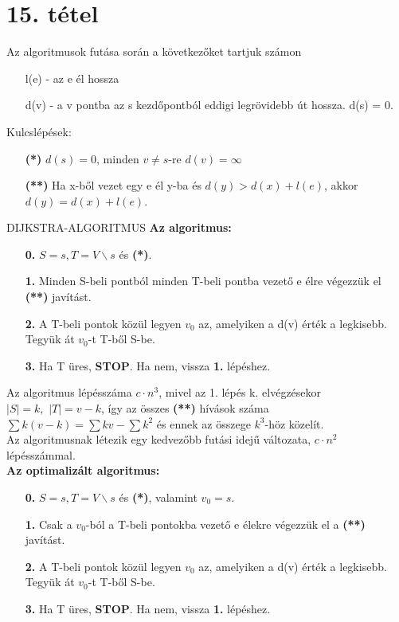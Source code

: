 \section{15. tétel}

\begin{tetel}{Az algoritmusok futása során a következőket tartjuk számon}
\begin{itemize}
\item[] l(e) - az e él hossza
\item[] d(v) - a v pontba az s kezdőpontból eddigi legrövidebb út hossza. d(s) = 0.
\end{itemize}
Kulcslépések:
\begin{itemize}
\item[\textbf{(*)}]$d(s) = 0$, minden $v \neq s$-re $d(v) = \infty$
\item[\textbf{(**)}]Ha x-ből vezet egy e él y-ba és $d(y) > d(x) + l(e)$, akkor $d(y) = d(x) + l(e)$.
\end{itemize}
\end{tetel}

\begin{tetel}{DIJKSTRA-ALGORITMUS}
\textbf{Az algoritmus:}
\begin{itemize}
\item[\textbf{0.}] $S = {s}, T = V\backslash {s}$ és \textbf{(*)}.
\item[\textbf{1.}] Minden S-beli pontból minden T-beli pontba vezető e élre végezzük el \textbf{(**)} javítást.
\item[\textbf{2.}] A T-beli pontok közül legyen $v_0$ az, amelyiken a d(v) érték a legkisebb. Tegyük át $v_0$-t T-ből S-be.
\item[\textbf{3.}] Ha T üres, \textbf{STOP}. Ha nem, vissza \textbf{1.} lépéshez.
\end{itemize}
Az algoritmus lépésszáma $c\cdot n^3$, mivel az 1. lépés k. elvégzésekor $|S| = k,\,\, |T| = v - k$, így az összes \textbf{(**)} hívások száma $\sum k(v-k) = \sum kv - \sum k^2$ és ennek az összege $k^3$-höz közelít.\\Az algoritmusnak létezik egy kedvezőbb futási idejű változata, $c\cdot n^2$ lépésszámmal.\\
\textbf{Az optimalizált algoritmus:}
\begin{itemize}
\item[\textbf{0.}] $S = {s}, T = V\backslash {s}$ és \textbf{(*)}, valamint $v_0 = s$.
\item[\textbf{1.}] Csak a $v_0$-ból a T-beli pontokba vezető e élekre végezzük el a \textbf{(**)} javítást.
\item[\textbf{2.}] A T-beli pontok közül legyen $v_0$ az, amelyiken a d(v) érték a legkisebb. Tegyük át $v_0$-t T-ből S-be.
\item[\textbf{3.}] Ha T üres, \textbf{STOP}. Ha nem, vissza \textbf{1.} lépéshez.
\end{itemize}
\end{tetel}


